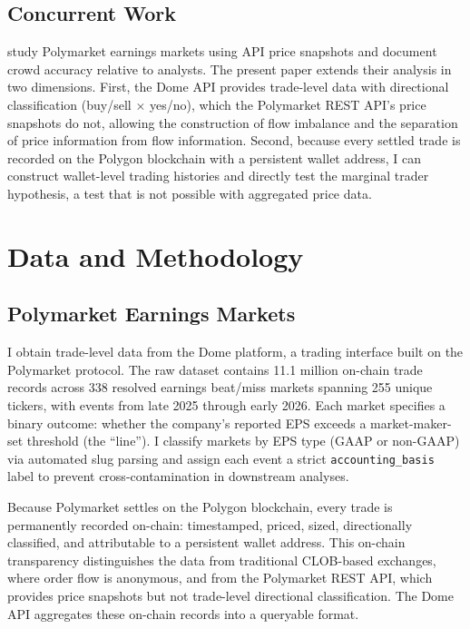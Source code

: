 \documentclass[11pt]{article}
\begin{document}
\subsection{Concurrent Work}

\citet{gomezcram2025financial} study Polymarket earnings markets using API price snapshots and document crowd accuracy relative to analysts. The present paper extends their analysis in two dimensions. First, the Dome API provides trade-level data with directional classification (buy/sell $\times$ yes/no), which the Polymarket REST API's price snapshots do not, allowing the construction of flow imbalance and the separation of price information from flow information. Second, because every settled trade is recorded on the Polygon blockchain with a persistent wallet address, I can construct wallet-level trading histories and directly test the marginal trader hypothesis, a test that is not possible with aggregated price data.

\section{Data and Methodology} \label{sec:data}

\subsection{Polymarket Earnings Markets}

I obtain trade-level data from the Dome platform, a trading interface built on the Polymarket protocol. The raw dataset contains 11.1 million on-chain trade records across 338 resolved earnings beat/miss markets spanning 255 unique tickers, with events from late 2025 through early 2026. Each market specifies a binary outcome: whether the company's reported EPS exceeds a market-maker-set threshold (the ``line''). I classify markets by EPS type (GAAP or non-GAAP) via automated slug parsing and assign each event a strict \texttt{accounting\_basis} label to prevent cross-contamination in downstream analyses.

Because Polymarket settles on the Polygon blockchain, every trade is permanently recorded on-chain: timestamped, priced, sized, directionally classified, and attributable to a persistent wallet address. This on-chain transparency distinguishes the data from traditional CLOB-based exchanges, where order flow is anonymous, and from the Polymarket REST API, which provides price snapshots but not trade-level directional classification. The Dome API aggregates these on-chain records into a queryable format.
\end{document}
